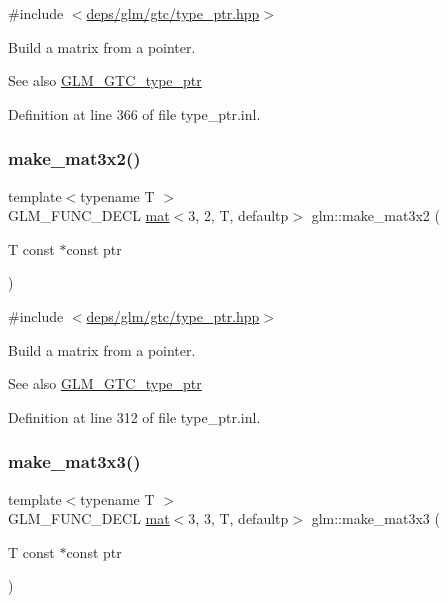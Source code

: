 {\ttfamily \#include $<$\hyperlink{type__ptr_8hpp}{deps/glm/gtc/type\+\_\+ptr.\+hpp}$>$}

Build a matrix from a pointer. \begin{DoxySeeAlso}{See also}
\hyperlink{group__gtc__type__ptr}{G\+L\+M\+\_\+\+G\+T\+C\+\_\+type\+\_\+ptr} 
\end{DoxySeeAlso}


Definition at line 366 of file type\+\_\+ptr.\+inl.

\mbox{\label{group__gtc__type__ptr_ga27a24e121dc39e6857620e0f85b6e1a8}} 
\subsubsection{\texorpdfstring{make\+\_\+mat3x2()}{make\_mat3x2()}}
{\footnotesize\ttfamily template$<$typename T $>$ \\
G\+L\+M\+\_\+\+F\+U\+N\+C\+\_\+\+D\+E\+CL \hyperlink{structglm_1_1mat}{mat}$<$3, 2, T, defaultp$>$ glm\+::make\+\_\+mat3x2 (\begin{DoxyParamCaption}\item[{T const $\ast$const}]{ptr }\end{DoxyParamCaption})}



{\ttfamily \#include $<$\hyperlink{type__ptr_8hpp}{deps/glm/gtc/type\+\_\+ptr.\+hpp}$>$}

Build a matrix from a pointer. \begin{DoxySeeAlso}{See also}
\hyperlink{group__gtc__type__ptr}{G\+L\+M\+\_\+\+G\+T\+C\+\_\+type\+\_\+ptr} 
\end{DoxySeeAlso}


Definition at line 312 of file type\+\_\+ptr.\+inl.

\mbox{\label{group__gtc__type__ptr_gaf2e8337b15c3362aaeb6e5849e1c0536}} 
\subsubsection{\texorpdfstring{make\+\_\+mat3x3()}{make\_mat3x3()}}
{\footnotesize\ttfamily template$<$typename T $>$ \\
G\+L\+M\+\_\+\+F\+U\+N\+C\+\_\+\+D\+E\+CL \hyperlink{structglm_1_1mat}{mat}$<$3, 3, T, defaultp$>$ glm\+::make\+\_\+mat3x3 (\begin{DoxyParamCaption}\item[{T const $\ast$const}]{ptr }\end{DoxyParamCaption})}



